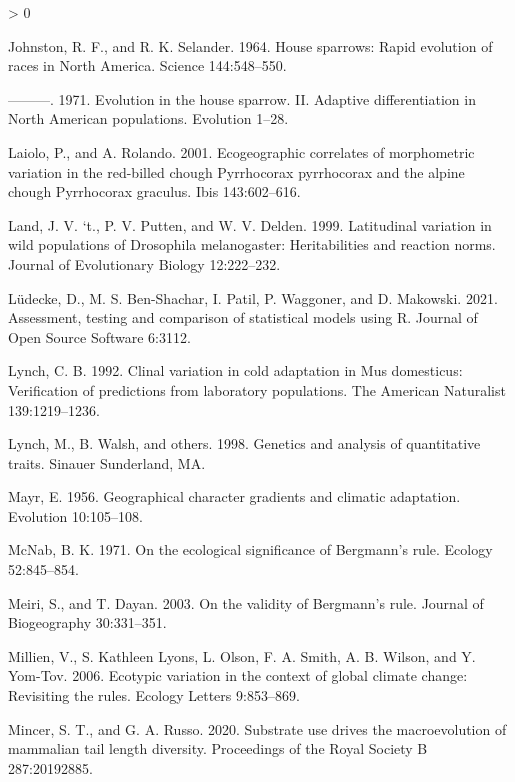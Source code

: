 \documentclass[
]{article}
\newlength{\cslhangindent}
\newenvironment{CSLReferences}[2] %
 {%
  \setlength{\parindent}{0pt}
  \ifodd #1 \everypar{\setlength{\hangindent}{\cslhangindent}}\ignorespaces\fi
  \ifnum #2 > 0
  \setlength{\parskip}{#2\baselineskip}
  \fi
 }%
 {}
\begin{document}
\begin{CSLReferences}{0}{0}
\leavevmode\hypertarget{ref-Johnston1964}{}%
Johnston, R. F., and R. K. Selander. 1964. House sparrows: Rapid
evolution of races in {North} {America}. Science 144:548--550.

\leavevmode\hypertarget{ref-Johnston1971}{}%
---------. 1971. Evolution in the house sparrow. II. Adaptive
differentiation in {North} {American} populations. Evolution 1--28.

\leavevmode\hypertarget{ref-Laiolo2001}{}%
Laiolo, P., and A. Rolando. 2001. Ecogeographic correlates of
morphometric variation in the red-billed chough {Pyrrhocorax}
pyrrhocorax and the alpine chough {Pyrrhocorax} graculus. Ibis
143:602--616.

\leavevmode\hypertarget{ref-Land1999}{}%
Land, J. V. `t., P. V. Putten, and W. V. Delden. 1999. Latitudinal
variation in wild populations of {Drosophila} melanogaster:
Heritabilities and reaction norms. Journal of Evolutionary Biology
12:222--232.

\leavevmode\hypertarget{ref-Luxfcdecke2021}{}%
Lüdecke, D., M. S. Ben-Shachar, I. Patil, P. Waggoner, and D. Makowski.
2021. Assessment, testing and comparison of statistical models using
{R}. Journal of Open Source Software 6:3112.

\leavevmode\hypertarget{ref-Lynch1992}{}%
Lynch, C. B. 1992. Clinal variation in cold adaptation in {Mus}
domesticus: Verification of predictions from laboratory populations. The
American Naturalist 139:1219--1236.

\leavevmode\hypertarget{ref-Lynch1998}{}%
Lynch, M., B. Walsh, and others. 1998. Genetics and analysis of
quantitative traits. Sinauer Sunderland, MA.

\leavevmode\hypertarget{ref-Mayr1956}{}%
Mayr, E. 1956. Geographical character gradients and climatic adaptation.
Evolution 10:105--108.

\leavevmode\hypertarget{ref-McNab1971}{}%
McNab, B. K. 1971. On the ecological significance of {Bergmann's} rule.
Ecology 52:845--854.

\leavevmode\hypertarget{ref-Meiri2003}{}%
Meiri, S., and T. Dayan. 2003. On the validity of {Bergmann's} rule.
Journal of Biogeography 30:331--351.

\leavevmode\hypertarget{ref-Millien2006}{}%
Millien, V., S. Kathleen Lyons, L. Olson, F. A. Smith, A. B. Wilson, and
Y. Yom-Tov. 2006. Ecotypic variation in the context of global climate
change: Revisiting the rules. Ecology Letters 9:853--869.

\leavevmode\hypertarget{ref-Mincer2020}{}%
Mincer, S. T., and G. A. Russo. 2020. Substrate use drives the
macroevolution of mammalian tail length diversity. Proceedings of the
Royal Society B 287:20192885.


\end{CSLReferences}
\end{document}
